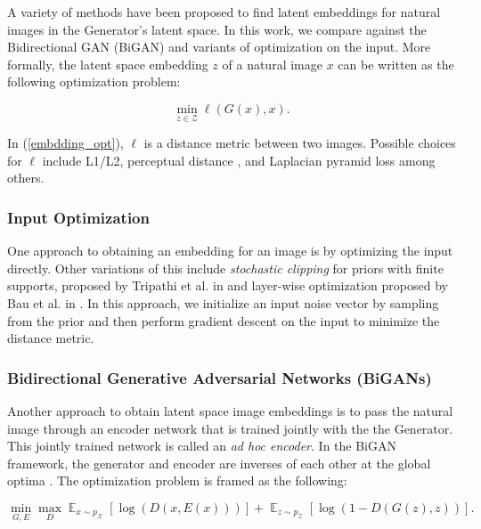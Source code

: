 \documentclass[10pt,twocolumn,letterpaper]{article}
\DeclareMathOperator*{\E}{\mathbb{E}}
\begin{document}
A variety of methods have been proposed to find latent embeddings for natural images in the Generator's latent space. In this work, we compare against the Bidirectional GAN (BiGAN) \cite{donahue2016bigan} and variants of optimization \cite{bau2019seeing} on the input. More formally, the latent space embedding $z$ of a natural image $x$ can be written as the following optimization problem:

\begin{equation}
    \min_{z\in\mathcal{Z}}{\ell(G(x), x)}.
    \label{embdding_opt}
\end{equation}

In (\ref{embdding_opt}), $\ell$ is a distance metric between two images. Possible choices for $\ell$ include L1/L2, perceptual distance \cite{zhang2018unreasonable}, and Laplacian pyramid loss \cite{ling2006diffusion} among others.

\subsubsection{Input Optimization}

One approach to obtaining an embedding for an image is by optimizing the input directly. Other variations of this include \textit{stochastic clipping} for priors with finite supports, proposed by Tripathi et al. in \cite{lipton2017precise} and layer-wise optimization proposed by Bau et al. in \cite{bau2019seeing}. In this approach, we initialize an input noise vector by sampling from the prior and then perform gradient descent on the input to minimize the distance metric.

\subsubsection{Bidirectional Generative Adversarial Networks (BiGANs)}

Another approach to obtain latent space image embeddings is to pass the natural image through an encoder network that is trained jointly with the the Generator. This jointly trained network is called an \textit{ad hoc encoder}. In the BiGAN framework, the generator and encoder are inverses of each other at the global optima \cite{donahue2016bigan, dumoulin2016adversarially}.  The optimization problem is framed as the following:

\begin{equation}
    \min_{G, E} \max_{D} \E_{x \sim p_{\mathcal{X}}}\left[\log(D(x, E(x)))\right] + \E_{z \sim p_{\mathcal{Z}}}\left[\log(1 - D(G(z), z))\right].
    \label{bigan_opt}
\end{equation}
\end{document}
